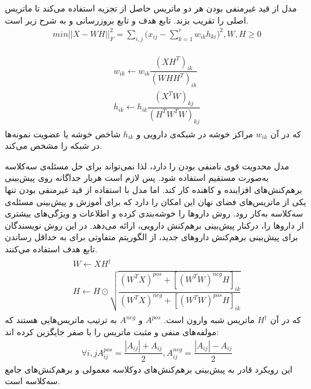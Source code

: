 مدل 
از قید غیرمنفی بودن هر دو ماتریس حاصل از تجزیه استفاده می‌کند تا ماتریس اصلی را تقریب بزند. تابع هدف و تابع‌ بروز‌رسانی
 و 
به شرح زیر است.
\begin{equation}
\begin{aligned}
min||X-WH||_F^2 =\sum_{i,j}{( x_{ij} -\sum_{k=1}^r w_{ik} h_{ki}})^2, 
W,H\geq0
\end{aligned}
\end{equation}

\begin{equation}
\begin{aligned}
\begin{split}
{w_{ik}}\longleftarrow{w_{ik}\dfrac{(XH^T)_{ik}}{(WHH^T)_{ik}}} 
\\
{h_{ik}}\longleftarrow{h_{ik}\dfrac{(X^TW)_{kj}}{(H^TW^TW)_{kj}}}
\end{split}
\end{aligned}
\end{equation}
که در آن
$w_{ik}$
مراکز خوشه در شبکه‌ی دارویی و
$h_{ik}$
شاخص
خوشه یا عضویت نمونه‌ها در شبکه را مشخص می‌کند.
 
مدل 
محدویت قوی نامنفی بودن را دارد، لذا نمی‌تواند برای حل مسئله‌ی سه‌کلاسه به‌صورت مستقیم استفاده شود. پس لازم است هربار جداگانه روی پیش‌بینی برهم‌کنش‌های افزاینده و کاهنده کار کند. اما مدل
با استفاده از قید غیرمنفی بودن تنها یکی از ماتریس‌های فضای نهان این امکان را دارد که برای آموزش و پیش‌بینی مسئله‌ی سه‌کلاسه به‌کار رود. روش 
داروها را خوشه‌بندی کرده و اطلاعات و ویژگی‌های بیشتری از داروها را، درکنار پیش‌بینی برهم‌کنش دارویی، ارائه می‌دهد. در این روش نویسندگان برای پیش‌بینی برهم‌کنش داروهای جدید، از الگوریتم متفاوتی برای به حداقل رساندن تابع هدف استفاده می‌کنند.
\begin{equation}
\begin{aligned}
\begin{split}
{W}\longleftarrow{XH^\dagger}
\\
{H}\longleftarrow{H\odot{\sqrt{\dfrac{(W^TX)^{pos}+[(W^TW)^{neg}H]_{ik}}{(W^TX)^{neg}+[(W^TW)^{pos}H]_{ik}}}}}
\end{split}
\end{aligned}
\end{equation}
که در آن
$H^\dagger$
ماتریس شبه وارون
است.
$A^{pos}$
و
$A^{neg}$
به ترتیب ماتریس‌هایی هستند که مولفه‌های منفی و مثبت ماتریس 
را با صفر جایگزین کرده اند:
\begin{equation}
\begin{aligned}
\forall i,j
A_{ij}^{pos}=\dfrac{|A_{ij}|+A_{ij}}{2}  ,   
A_{ij}^{neg}=\dfrac{|A_{ij}|-A_{ij}}{2} 
\end{aligned}
\end{equation}
این رویکرد قادر به پیش‌بینی برهم‌کنش‌های دوکلاسه معمولی و برهم‌کنش‌های جامع سه‌کلاسه است.

